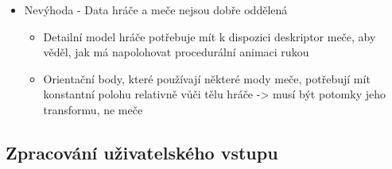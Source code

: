 \begin{itemize}
\begin{itemize}
            \item Nevýhoda - Data hráče a meče nejsou dobře oddělená
                \begin{itemize}
                    \item Detailní model hráče potřebuje mít k dispozici deskriptor meče, aby věděl, jak má napolohovat procedurální animaci rukou
                    \item Orientační body, které používají některé mody meče, potřebují mít konstantní polohu relativně vůči tělu hráče -> musí být potomky jeho transformu, ne meče
                \end{itemize}
        \end{itemize} 
\end{itemize}

\subsection{Zpracování uživatelského vstupu}
